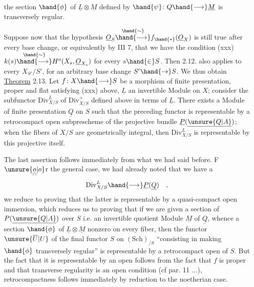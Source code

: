 
the section $\hand{\phi}$ of $\underline{L}\otimes\underline{M}$ defined by $\hand{\psi}$: $Q\hand{\longrightarrow}\underline{M}$ is transversely
regular.

Suppose now that the hypothesis $\underline{O}_S\overset{\hand{\sim}}{\hand{\longrightarrow}}f_{\hand{*}}(\underline{O}_X)$ is still true
after every base change, or equivalently by III 7,
that we have the condition
(xxx) \qquad\qquad $k(s)\overset{\hand{\sim}}{\hand{\longrightarrow}}H^o(X_s,\underline{O}_{X_s})$
for every $s\hand{\in} S$. Then 2.12. also applies to every $X_{S'}/S'$, for an
arbitrary base change $S'\hand{\rightarrow} S$. We thus obtain
\uline{Theorem} 2.13. Let $f\colon X\hand{\longrightarrow} S$ be a  morphism of finite presentation,
proper and flat satisfying (xxx) above, $\underline{L}$ an invertible Module
on $X$; consider the subfunctor $\mathrm{Div}^{L}_{X/S}$ of $\mathrm{Div}^{+}_{X/S}$ defined above in
terms of $\underline{L}$.  There exists a Module of finite presentation $\underline{Q}$ on
$S$ such that the preceding functor is representable by a retrocompact open
subprescheme of the projective bundle $\underline{P}(\underline{\unsure{Q|A}})$; when the fibers of $X/S$
are geometrically integral, then $\mathrm{Div}^{L}_{X/S}$ is representable by this
projective   itself.

The last assertion follows immediately from what we had said
before. F$\unsure{\underset{\cap}{o}|o}$r the general case, we had already noted that we have a 
\[
\mathrm{Div}^{L}_{X/S}\hand{\longrightarrow}\underline{P}(\underline{Q}) \quad ,
\]
we reduce to proving that the latter is representable by a quasi-compact open
immersion, which reduces us to proving that if we are given
a section of $P(\underline{\unsure{Q|A}})$ over $S$ i.e. an invertible quotient Module $\underline{M}$ of $\underline{Q}$,
whence a section $\hand{\phi}$ of $\underline{L}\otimes\underline{M}$ nonzero on every fiber, then the functor
$\unsure{\overline{U}|U}$ of the final functor $S$ on $(\mathrm{Sch})_{/S}$ ``consisting in making $\hand{\phi}$ transversely
regular'' is representable by a retrocompact open of $S$. But
the fact that it is representable by an open follows from the fact that $f$ is
proper and that transverse regularity is an open condition (cf par.
11 ...), retrocompactness follows immediately by reduction to the
noetherian case.

